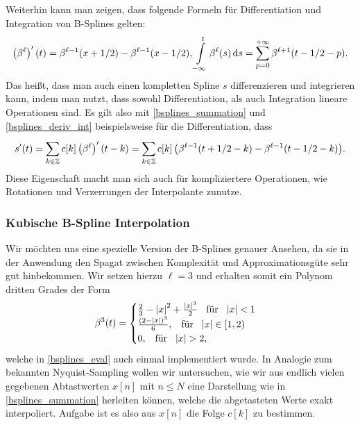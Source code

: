 Weiterhin kann man zeigen, dass folgende Formeln f\"ur Differentiation und Integration von B-Splines gelten:
\begin{equation}\label{bsplines_deriv_int}
    \left(\beta^\ell\right)^\prime(t) =
        \beta^{\ell-1}(x + 1/2) - \beta^{\ell-1}(x - 1/2), 
    {\int\limits_{-\infty}^{t}{\beta^\ell(s)}\,\mathrm{d}{s}} = 
        {\sum\limits_{p = 0}^{+\infty}{\beta^{\ell+1}(t - 1/2 - p)}}.
\end{equation}
Das hei{\ss}t, dass man auch einen kompletten Spline $s$ differenzieren und integrieren kann, indem man nutzt, dass sowohl Differentiation, als auch Integration lineare Operationen sind. Es gilt also mit \eqref{bsplines_summation} und \eqref{bsplines_deriv_int} beispielsweise f\"ur die Differentiation, dass
\begin{equation}
    s^\prime(t) = {\sum\limits_{k \in \mathbb{Z}}^{}{
        c[k] \left(\beta^{\ell}\right)^\prime(t - k)
    }}
    = {\sum\limits_{k \in \mathbb{Z}}^{}{
        c[k]\left(
            \beta^{\ell-1}(t + 1/2 - k) - \beta^{\ell-1}(t - 1/2 - k)
        \right)
    }}.
\end{equation}
%
Diese Eigenschaft macht man sich auch f\"ur kompliziertere Operationen, wie Rotationen und Verzerrungen der Interpolante zunutze.
%
%
\subsubsection{Kubische B-Spline Interpolation}
%
%
Wir m\"ochten uns eine spezielle Version der B-Splines genauer Ansehen, da sie in der Anwendung den Spagat zwischen Komplexit\"at und Approximationsg\"ute sehr gut hinbekommen. Wir setzen hierzu $\ell=3$ und erhalten somit ein Polynom dritten Grades der Form
\begin{equation}
    \beta^3(t) = \begin{cases}
        \frac 23 - {\left| x \right|}^2 + \frac{{\left| x \right|}^3}{2} {\hspace{3mm} \text{f\"ur} \hspace{3mm}} {\left| x \right|} < 1\\
        \frac{(2 - {\left| x \right|})^3}{6}, {\hspace{3mm} \text{f\"ur} \hspace{3mm}} {\left| x \right|} \in [1, 2) \\
        0, {\hspace{3mm} \text{f\"ur} \hspace{3mm}} {\left| x \right|} > 2,
    \end{cases}
\end{equation}
welche in \cref{bsplines_eval} auch einmal implementiert wurde. In Analogie zum bekannten Nyquist-Sampling wollen wir untersuchen, wie wir aus endlich vielen gegebenen Abtastwerten $x[n]$ mit $n \leqslant N$ eine Darstellung wie in \eqref{bsplines_summation} herleiten k\"onnen, welche die abgetasteten Werte exakt interpoliert. Aufgabe ist es also aus $x[n]$ die Folge $c[k]$ zu bestimmen.


